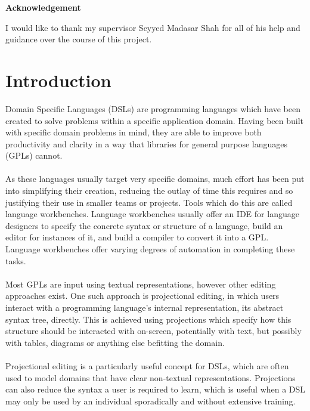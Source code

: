 \documentclass{article}
\begin{document}
\begin{center}
	\vspace {1.5cm}
    \Large
    \textbf{Acknowledgement}
\end{center}
I would like to thank my supervisor Seyyed Madasar Shah for all of his help and guidance over the course of this project.




\clearpage
\tableofcontents
\clearpage

\section{Introduction}

Domain Specific Languages (DSLs) are programming languages which have been created to solve problems within a specific application domain. Having been built with specific domain problems in mind, they are able to improve both productivity and clarity in a way that libraries for general purpose languages (GPLs) cannot. 
\\
\\
As these languages usually target very specific domains, much effort has been put into simplifying their creation, reducing the outlay of time this requires and so justifying their use in smaller teams or projects. Tools which do this are called language workbenches. Language workbenches usually offer an IDE for language designers to specify the concrete syntax or structure of a language, build an editor for instances of it, and build a compiler to convert it into a GPL. Language workbenches offer varying degrees of automation in completing these tasks.
\\
\\
Most GPLs are input using textual representations, however other editing approaches exist. One such approach is projectional editing, in which users interact with a programming language's internal representation, its abstract syntax tree, directly. This is achieved using projections which specify how this structure should be interacted with on-screen, potentially with text, but possibly with tables, diagrams or anything else befitting the domain. 
\\
\\
Projectional editing is a particularly useful concept for DSLs, which are often used to model domains that have clear non-textual representations. Projections can also reduce the syntax a user is required to learn, which is useful when a DSL may only be used by an individual sporadically and without extensive training.
\end{document}

